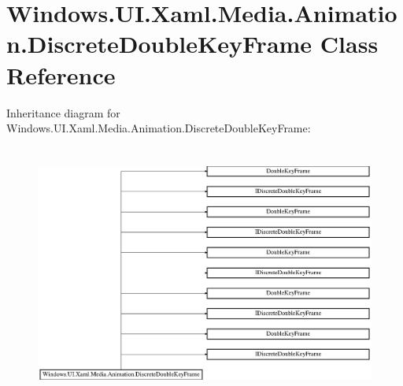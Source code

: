 \hypertarget{class_windows_1_1_u_i_1_1_xaml_1_1_media_1_1_animation_1_1_discrete_double_key_frame}{}\section{Windows.\+U\+I.\+Xaml.\+Media.\+Animation.\+Discrete\+Double\+Key\+Frame Class Reference}
\label{class_windows_1_1_u_i_1_1_xaml_1_1_media_1_1_animation_1_1_discrete_double_key_frame}
Inheritance diagram for Windows.\+U\+I.\+Xaml.\+Media.\+Animation.\+Discrete\+Double\+Key\+Frame\+:\begin{figure}[H]
\begin{center}
\leavevmode
\includegraphics[height=8.461538cm]{class_windows_1_1_u_i_1_1_xaml_1_1_media_1_1_animation_1_1_discrete_double_key_frame}
\end{center}
\end{figure}
